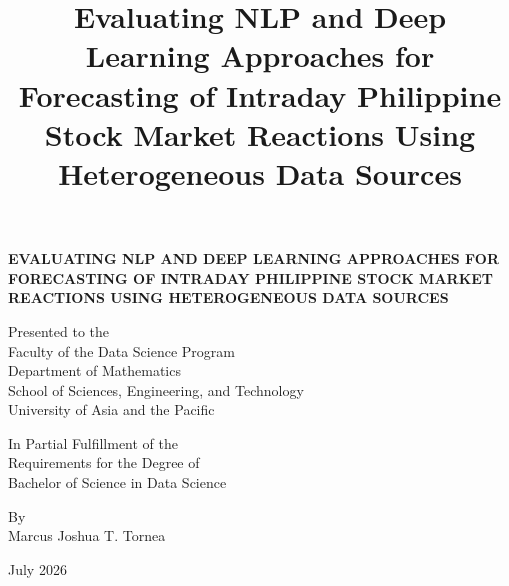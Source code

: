 \documentclass[stu,floatsintext]{apa7}
\title{Evaluating NLP and Deep Learning Approaches for Forecasting of Intraday Philippine Stock Market Reactions Using Heterogeneous Data Sources}
\begin{document}


\begin{titlepage}
\thispagestyle{empty}
\begin{center}
\vspace*{1in}

{\bfseries EVALUATING NLP AND DEEP LEARNING APPROACHES FOR FORECASTING
OF INTRADAY PHILIPPINE STOCK MARKET REACTIONS USING HETEROGENEOUS
DATA SOURCES}

\vspace{0.5in}
Presented to the\\
Faculty of the Data Science Program\\
Department of Mathematics\\
School of Sciences, Engineering, and Technology\\
University of Asia and the Pacific

\vspace{0.5in}
In Partial Fulfillment of the\\
Requirements for the Degree of\\
Bachelor of Science in Data Science

\vspace{0.75in}
By\\
\vspace{0.15in}
Marcus Joshua T. Tornea

\vspace{0.75in}
July 2026

\end{center}
\end{titlepage}
\end{document}
